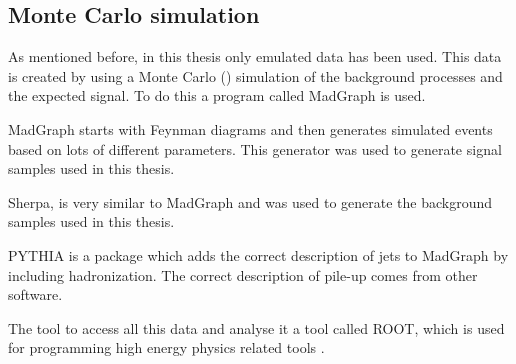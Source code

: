 \subsection{Monte Carlo simulation}
As mentioned before, in this thesis only emulated data has been used. This data is created by using a Monte Carlo (\abbrMC) simulation of the background processes and the expected signal. To do this a program called MadGraph is used.

MadGraph \citep{madgraph} starts with Feynman diagrams and then generates simulated events based on lots of different parameters. This generator was used to generate signal samples used in this thesis. 

Sherpa, \citep{sherpa} is very similar to MadGraph and was used to generate the background samples used in this thesis.

PYTHIA \citep{Sjostrand:2008} is a package which adds the correct description of jets to MadGraph by including hadronization. The correct description of pile-up comes from other \abbrATLAS software.

The tool to access all this data and analyse it a tool called ROOT, which is used for programming high energy physics related tools \citep{root}.